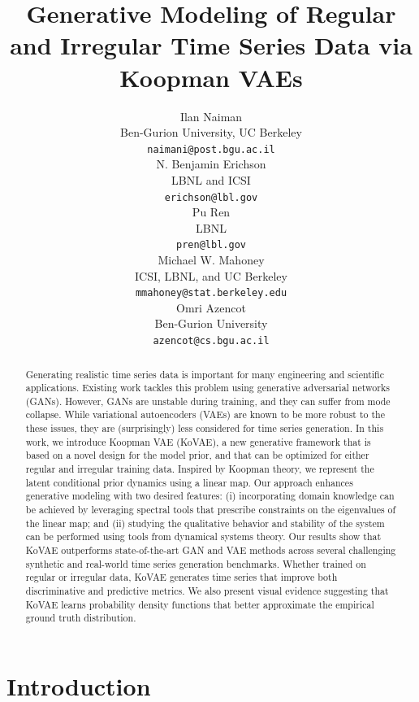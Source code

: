 \documentclass{article} %
\title{Generative Modeling of Regular and Irregular Time Series Data via Koopman VAEs}
\author{Ilan Naiman\\
Ben-Gurion University, UC Berkeley\\
\texttt{naimani@post.bgu.ac.il}\\
\And 
N. Benjamin Erichson\\
LBNL and ICSI\\
\texttt{erichson@lbl.gov}\\
\And
Pu Ren\\
LBNL\\
\texttt{pren@lbl.gov}\\
\AND
Michael W. Mahoney \\
ICSI, LBNL, and UC Berkeley\\
\texttt{mmahoney@stat.berkeley.edu}\\
\And 
Omri Azencot \\
Ben-Gurion University\\
\texttt{azencot@cs.bgu.ac.il}\\
}
\begin{document}
\maketitle

\begin{abstract}
Generating realistic time series data is important for many engineering and scientific applications. 
Existing work tackles this problem using generative adversarial networks (GANs).
However, GANs are unstable during training, and they can suffer from mode collapse. 
While variational autoencoders (VAEs) are known to be more robust to the these issues, they are (surprisingly) less considered for time series generation. 
In this work, we introduce Koopman VAE (KoVAE), a new generative framework that is based on a novel design for the model prior, and that can be optimized for either regular and irregular training data. 
Inspired by Koopman theory, we represent the latent conditional prior dynamics using a linear map. 
Our approach enhances generative modeling with two desired features: (i) incorporating domain knowledge can be achieved by leveraging spectral tools that prescribe constraints on the eigenvalues of the linear map; and (ii) studying the qualitative behavior and stability of the system can be performed using tools from dynamical systems theory. 
Our results show that KoVAE outperforms state-of-the-art GAN and VAE methods across several challenging synthetic and real-world time series generation benchmarks. 
Whether trained on regular or irregular data, KoVAE generates time series that improve both discriminative and predictive metrics. 
We also present visual evidence suggesting that KoVAE learns probability density functions that better approximate the empirical ground truth distribution. 


\end{abstract}

\section{Introduction}
\label{sec:intro}
\end{document}

